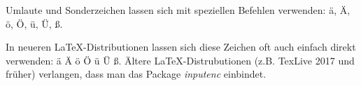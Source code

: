 \documentclass{article}
\begin{document}
Umlaute und Sonderzeichen lassen sich mit speziellen Befehlen verwenden: \"a, \"A, \"o, \"O, \"u, \"U, {\ss}.

In neueren LaTeX-Distributionen lassen sich diese Zeichen oft auch einfach direkt verwenden: ä Ä ö Ö ü Ü ß. Ältere LaTeX-Distrubutionen (z.B. TexLive 2017 und früher) verlangen, dass man das Package \textit{inputenc} einbindet.
\end{document}
